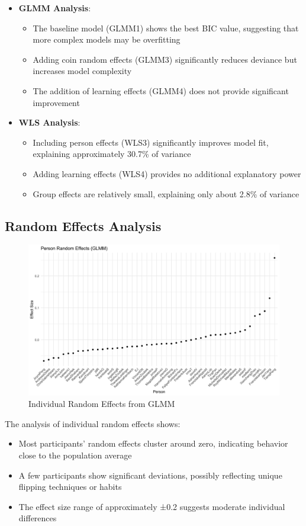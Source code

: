 \documentclass[12pt,a4paper]{article}
\begin{document}
\begin{itemize}
    \item \textbf{GLMM Analysis}:
    \begin{itemize}
        \item The baseline model (GLMM1) shows the best BIC value, suggesting that more complex models may be overfitting
        \item Adding coin random effects (GLMM3) significantly reduces deviance but increases model complexity
        \item The addition of learning effects (GLMM4) does not provide significant improvement
    \end{itemize}
    
    \item \textbf{WLS Analysis}:
    \begin{itemize}
        \item Including person effects (WLS3) significantly improves model fit, explaining approximately 30.7\% of variance
        \item Adding learning effects (WLS4) provides no additional explanatory power
        \item Group effects are relatively small, explaining only about 2.8\% of variance
    \end{itemize}
\end{itemize}

\subsection{Random Effects Analysis}
\begin{figure}[h!]
    \centering
    \includegraphics[width=0.8\linewidth]{person_effects_glmm.png}
    \caption{Individual Random Effects from GLMM}
    \label{fig:person-effects}
\end{figure}

The analysis of individual random effects shows:
\begin{itemize}
    \item Most participants' random effects cluster around zero, indicating behavior close to the population average
    \item A few participants show significant deviations, possibly reflecting unique flipping techniques or habits
    \item The effect size range of approximately ±0.2 suggests moderate individual differences
\end{itemize}
\end{document}
